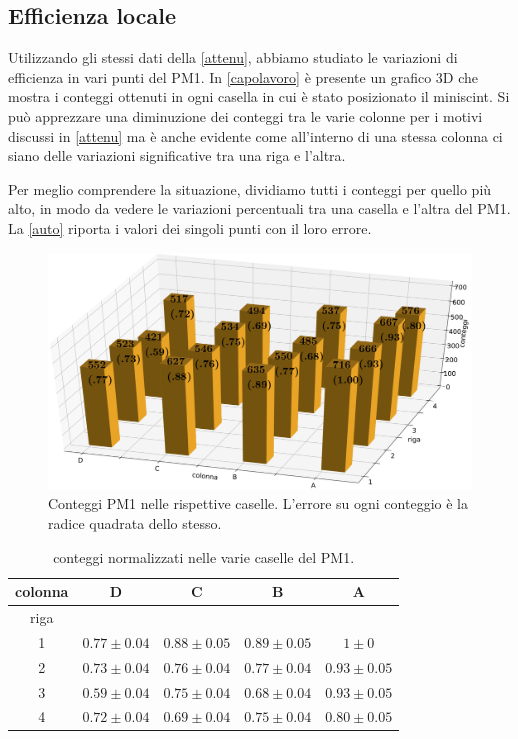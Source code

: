 \subsection{Efficienza locale}
\label{localis}
Utilizzando gli stessi dati della \autoref{attenu}, abbiamo studiato le variazioni di efficienza in vari punti del PM1. In \autoref{capolavoro} è presente un grafico 3D che mostra i conteggi ottenuti in ogni casella in cui è stato posizionato il miniscint. Si può apprezzare una diminuzione dei conteggi tra le varie colonne per i motivi discussi in \autoref{attenu} ma è anche evidente come all'interno di una stessa colonna ci siano delle variazioni significative tra una riga e l'altra.

Per meglio comprendere la situazione, dividiamo tutti i conteggi per quello più alto,
in modo da vedere le variazioni percentuali tra una casella e l'altra del PM1.
La \autoref{auto} riporta i valori dei singoli punti con il loro errore.

\begin{figure}[h]
\includegraphics[width=\textwidth]{3d_grande}
\caption{Conteggi PM1 nelle rispettive caselle. L'errore su ogni conteggio è la radice quadrata dello stesso.}
\label{capolavoro}
\end{figure}

\begin{table}[h]
\centering
\begin{tabular}{|c|c|c|c|c|}
\hline
colonna & D & C & B & A \\
 \hline
riga  & & & &  \\
1 &  $ 0.77 \pm 0.04 $ & $ 0.88 \pm 0.05 $ & $ 0.89 \pm 0.05 $ & $ 1 \pm 0 $ \\ 
2 &  $ 0.73 \pm 0.04 $ & $ 0.76 \pm 0.04 $ & $ 0.77 \pm 0.04 $ & $ 0.93 \pm 0.05 $ \\ 
3 &  $ 0.59 \pm 0.04 $ & $ 0.75 \pm 0.04 $ & $ 0.68 \pm 0.04 $ & $ 0.93 \pm 0.05 $ \\ 
4 &  $ 0.72 \pm 0.04 $ & $ 0.69 \pm 0.04 $ & $ 0.75 \pm 0.04 $ & $ 0.80 \pm 0.05 $ \\
\hline 
\end{tabular}
\caption{conteggi normalizzati nelle varie caselle del PM1.}
\label{auto}
\end{table}

